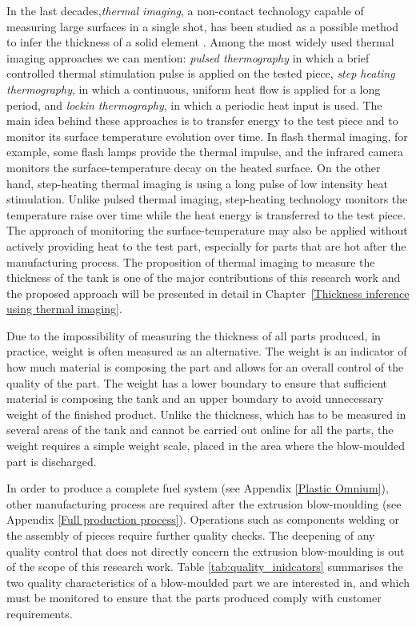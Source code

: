 In the last decades,\textit{thermal imaging}, a non-contact technology capable of measuring large surfaces in a single shot, has been studied as a possible method to infer the thickness of a solid element \citep{sun2003method,sun2006analysis,choi2008quantitative,benitez2008definition,zeng2012absolute,li2018thickness,he2013eddy}. Among the most widely used thermal imaging approaches we can mention: \textit{pulsed thermography} in which a brief controlled thermal stimulation pulse is applied on the tested piece, \textit{step heating thermography}, in which a continuous, uniform heat flow is applied for a long period, and \textit{lockin thermography}, in which a periodic heat input is used. The main idea behind these approaches is to transfer energy to the test piece and to monitor its surface temperature evolution over time. In flash thermal imaging, for example, some flash lamps provide the thermal impulse, and the infrared camera monitors the surface-temperature decay on the heated surface. On the other hand, step-heating thermal imaging is using a long pulse of low intensity heat stimulation. Unlike pulsed thermal imaging, step-heating technology monitors the temperature raise over time while the heat energy is transferred to the test piece. The approach of monitoring the surface-temperature may also be applied without actively providing heat to the test part, especially for parts that are hot after the manufacturing process. The proposition of thermal imaging to measure the thickness of the tank is one of the major contributions of this research work and the proposed approach will be presented in detail in Chapter~\ref{Thickness inference using thermal imaging}.

Due to the impossibility of measuring the thickness of all parts produced, in practice, weight is often measured as an alternative. The weight is an indicator of how much material is composing the part and allows for an overall control of the quality of the part. The weight has a lower boundary to ensure that sufficient material is composing the tank and an upper boundary to avoid unnecessary weight of the finished product. Unlike the thickness, which has to be measured in several areas of the tank and cannot be carried out online for all the parts, the weight requires a simple weight scale, placed in the area where the blow-moulded part is discharged. 

In order to produce a complete fuel system (see Appendix \ref{Plastic Omnium}), other manufacturing process are required after the extrusion blow-moulding (see Appendix \ref{Full production process}). Operations such as components welding or the assembly of pieces require further quality checks. The deepening of any quality control that does not directly concern the extrusion blow-moulding is out of the scope of this research work. Table \ref{tab:quality_inidcators} summarises the two quality characteristics of a blow-moulded part we are interested in, and which must be monitored to ensure that the parts produced comply with customer requirements. 


